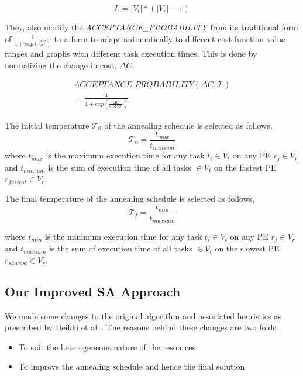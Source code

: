 \begin{equation}
L = |V_t|*(|V_r| - 1)
\end{equation}

They, also modify the \textit{ACCEPTANCE\_PROBABILITY} from its traditional form
of $\frac{1}{1+exp(\frac{\Delta C}{\mathcal{T}})}$ to a form to adapt
automatically to different cost function value ranges and graphs with different
task execution times. This is done by normalizing the change in cost, $\Delta
C$,

\begin{equation}
  \begin{array}{c}
    ACCEPTANCE\_PROBABILITY(\Delta C, \mathcal{T}) \\ 
    = \frac{1}{1+exp(\frac{\Delta C}{0.5C_0\mathcal{T}})}
  \end{array}
\end{equation}

The initial temperature $\mathcal{T}_0$ of the annealing schedule is selected as
follows,
\begin{equation}
\mathcal{T}_0 = \frac{t_{max}}{t_{minsum}}
\end{equation}
where $t_{max}$ is the maximum execution time for any task $t_i \in V_t$ on any
PE $r_j \in V_r$ and $t_{minsum}$ is the sum of execution time of all tasks $\in
V_t$ on the fastest PE $r_{fastest} \in V_r$.

The final temperature of the annealing schedule is selected as follows,
\begin{equation}
\mathcal{T}_f = \frac{t_{min}}{t_{maxsum}}
\end{equation}

where $t_{min}$ is the minimum execution time for any task $t_i \in V_t$
on any PE $r_j \in V_r$ and $t_{maxsum}$ is the sum of execution time of
all tasks $\in V_t$ on the slowest PE $r_{slowest} \in V_r$. %

\subsection{Our Improved SA Approach}
\label{sec:our-improved-sa}

We made some changes to the original algorithm and associated heuristics as
prescribed by Heikki et al~\cite{hors06}. The reasons behind these changes are two folds.
\begin{itemize}
\item To suit the heterogeneous nature of the resources
\item To improve the annealing schedule and hence the final solution
\end{itemize}

